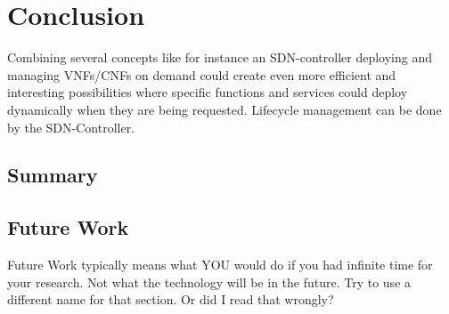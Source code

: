 \section{Conclusion}
Combining several concepts like for instance an SDN-controller deploying and managing VNFs/CNFs  on demand could create even more efficient and interesting possibilities where specific functions and services could deploy dynamically when they are being requested. Lifecycle management can be done by the SDN-Controller. 


\subsection{Summary}

\subsection{Future Work}
Future Work typically means what YOU would do if you had infinite time for your research. Not what the technology will be in the future. Try to use a different name for that section. Or did I read that wrongly?